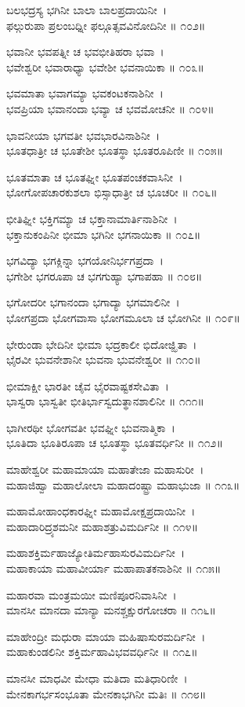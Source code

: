 ಬಲಭದ್ರಸ್ಯ ಭಗಿನೀ ಬಾಲಾ ಬಾಲಪ್ರದಾಯಿನೀ~।\\
ಫಲ್ಗುರುಪಾ ಪ್ರಲಂಬಧ್ನೀ ಫಲ್ಗೂತ್ಸವವಿನೋದಿನೀ ॥ ೧೦೨॥

ಭವಾನೀ ಭವಪತ್ನೀ ಚ ಭವಭೀತಿಹರಾ ಭವಾ~।\\
ಭವೇಶ್ವರೀ ಭವಾರಾಧ್ಯಾ ಭವೇಶೀ ಭವನಾಯಿಕಾ ॥ ೧೦೩॥

ಭವಮಾತಾ ಭವಾಗಮ್ಯಾ ಭವಕಂಟಕನಾಶಿನೀ~।\\
ಭವಪ್ರಿಯಾ ಭವಾನಂದಾ ಭವ್ಯಾ ಚ ಭವಮೋಚನೀ ॥ ೧೦೪॥

ಭಾವನೀಯಾ ಭಗವತೀ ಭವಭಾರವಿನಾಶಿನೀ~।\\
ಭೂತಧಾತ್ರೀ ಚ ಭೂತೇಶೀ ಭೂತಸ್ಥಾ ಭೂತರೂಪಿಣೀ ॥ ೧೦೫॥

ಭೂತಮಾತಾ ಚ ಭೂತಘ್ನೀ ಭೂತಪಂಚಕವಾಸಿನೀ~।\\
ಭೋಗೋಪಚಾರಕುಶಲಾ ಭಿಸ್ಸಾಧಾತ್ರೀ ಚ ಭೂಚರೀ ॥ ೧೦೬॥

ಭೀತಿಘ್ನೀ ಭಕ್ತಿಗಮ್ಯಾ ಚ ಭಕ್ತಾನಾಮಾರ್ತಿನಾಶಿನೀ~।\\
ಭಕ್ತಾನುಕಂಪಿನೀ ಭೀಮಾ ಭಗಿನೀ ಭಗನಾಯಿಕಾ ॥ ೧೦೭॥

ಭಗವಿದ್ಯಾ ಭಗಕ್ಲಿನ್ನಾ ಭಗಯೋನಿರ್ಭಗಪ್ರದಾ~।\\
ಭಗೇಶೀ ಭಗರೂಪಾ ಚ ಭಗಗುಹ್ಯಾ ಭಗಾಪಹಾ ॥ ೧೦೮॥

ಭಗೋದರೀ ಭಗಾನಂದಾ ಭಗಾದ್ಯಾ ಭಗಮಾಲಿನೀ~।\\
ಭೋಗಪ್ರದಾ ಭೋಗವಾಸಾ ಭೋಗಮೂಲಾ ಚ ಭೋಗಿನೀ ॥ ೧೦೯॥

ಭೇರುಂಡಾ ಭೇದಿನೀ ಭೀಮಾ ಭದ್ರಕಾಲೀ ಭಿದೋಜ್ಝಿತಾ~।\\
ಭೈರವೀ ಭುವನೇಶಾನೀ ಭುವನಾ ಭುವನೇಶ್ವರೀ ॥ ೧೧೦॥

ಭೀಮಾಕ್ಷೀ ಭಾರತೀ ಚೈವ ಭೈರವಾಷ್ಟಕಸೇವಿತಾ~।\\
ಭಾಸ್ವರಾ ಭಾಸ್ವತೀ ಭೀತಿರ್ಭಾಸ್ವದುತ್ಥಾನಶಾಲಿನೀ ॥ ೧೧೧॥

ಭಾಗೀರಥೀ ಭೋಗವತೀ ಭವಘ್ನೀ ಭುವನಾತ್ಮಿಕಾ~।\\
ಭೂತಿದಾ ಭೂತಿರೂಪಾ ಚ ಭೂತಸ್ಥಾ ಭೂತವರ್ಧಿನೀ ॥ ೧೧೨॥

ಮಾಹೇಶ್ವರೀ ಮಹಾಮಾಯಾ ಮಹಾತೇಜಾ ಮಹಾಸುರೀ~।\\
ಮಹಾಜಿಹ್ವಾ ಮಹಾಲೋಲಾ ಮಹಾದಂಷ್ಟ್ರಾ ಮಹಾಭುಜಾ ॥ ೧೧೩॥

ಮಹಾಮೋಹಾಂಧಕಾರಘ್ನೀ ಮಹಾಮೋಕ್ಷಪ್ರದಾಯಿನೀ~।\\
ಮಹಾದಾರಿದ್ರ್ಯಶಮನೀ ಮಹಾಶತ್ರುವಿಮರ್ದಿನೀ ॥ ೧೧೪॥

ಮಹಾಶಕ್ತಿರ್ಮಹಾಜ್ಯೋತಿರ್ಮಹಾಸುರವಿಮರ್ದಿನೀ~।\\
ಮಹಾಕಾಯಾ ಮಹಾವೀರ್ಯಾ ಮಹಾಪಾತಕನಾಶಿನೀ ॥ ೧೧೫॥

ಮಹಾರವಾ ಮಂತ್ರಮಯೀ ಮಣಿಪೂರನಿವಾಸಿನೀ~।\\
ಮಾನಸೀ ಮಾನದಾ ಮಾನ್ಯಾ ಮನಶ್ಚಕ್ಷುರಗೋಚರಾ ॥ ೧೧೬॥

ಮಾಹೇಂದ್ರೀ ಮಧುರಾ ಮಾಯಾ ಮಹಿಷಾಸುರಮರ್ದಿನೀ~।\\
ಮಹಾಕುಂಡಲಿನೀ ಶಕ್ತಿರ್ಮಹಾವಿಭವವರ್ಧಿನೀ ॥ ೧೧೭॥

ಮಾನಸೀ ಮಾಧವೀ ಮೇಧಾ ಮತಿದಾ ಮತಿಧಾರಿಣೀ~।\\
ಮೇನಕಾಗರ್ಭಸಂಭೂತಾ ಮೇನಕಾಭಗಿನೀ ಮತಿಃ ॥ ೧೧೮॥

